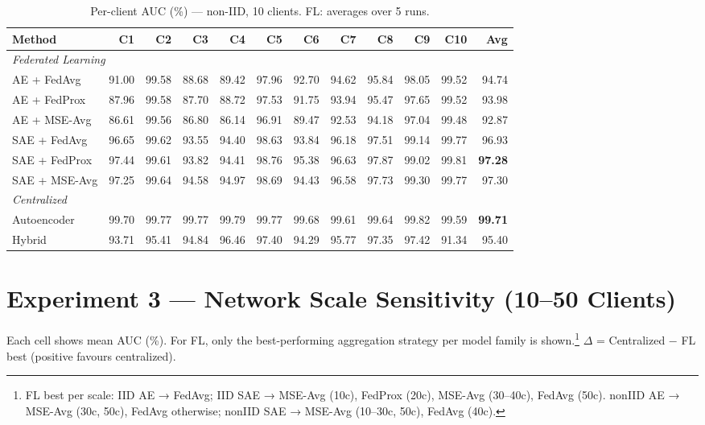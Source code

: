 \documentclass[11pt,a4paper]{article}
\begin{document}
\begin{table}[ht]
\centering
\caption{Per-client AUC (\%) — non-IID, 10 clients. FL: averages over 5 runs.}
\label{tab:per-client-noniid}
\tiny\setlength{\tabcolsep}{4pt}
\begin{tabular}{lrrrrrrrrrrr}
\toprule
\textbf{Method} & C1 & C2 & C3 & C4 & C5 & C6 & C7 & C8 & C9 & C10 & \textbf{Avg} \\
\midrule
\multicolumn{12}{l}{\textit{Federated Learning}} \\
AE + FedAvg     & 91.00 & 99.58 & 88.68 & 89.42 & 97.96 & 92.70 & 94.62 & 95.84 & 98.05 & 99.52 & 94.74 \\
AE + FedProx    & 87.96 & 99.58 & 87.70 & 88.72 & 97.53 & 91.75 & 93.94 & 95.47 & 97.65 & 99.52 & 93.98 \\
AE + MSE-Avg    & 86.61 & 99.56 & 86.80 & 86.14 & 96.91 & 89.47 & 92.53 & 94.18 & 97.04 & 99.48 & 92.87 \\
SAE + FedAvg    & 96.65 & 99.62 & 93.55 & 94.40 & 98.63 & 93.84 & 96.18 & 97.51 & 99.14 & 99.77 & 96.93 \\
SAE + FedProx   & 97.44 & 99.61 & 93.82 & 94.41 & 98.76 & 95.38 & 96.63 & 97.87 & 99.02 & 99.81 & \textbf{97.28} \\
SAE + MSE-Avg   & 97.25 & 99.64 & 94.58 & 94.97 & 98.69 & 94.43 & 96.58 & 97.73 & 99.30 & 99.77 & 97.30 \\
\midrule
\multicolumn{12}{l}{\textit{Centralized}} \\
Autoencoder     & 99.70 & 99.77 & 99.77 & 99.79 & 99.77 & 99.68 & 99.61 & 99.64 & 99.82 & 99.59 & \textbf{99.71} \\
Hybrid          & 93.71 & 95.41 & 94.84 & 96.46 & 97.40 & 94.29 & 95.77 & 97.35 & 97.42 & 91.34 & 95.40 \\
\bottomrule
\end{tabular}
\end{table}

\newpage
\section{Experiment 3 — Network Scale Sensitivity (10–50 Clients)}

Each cell shows mean AUC (\%).  For FL, only the best-performing aggregation
strategy per model family is shown.\footnote{FL best per scale:
  IID AE → FedAvg; IID SAE → MSE-Avg (10c), FedProx (20c), MSE-Avg (30–40c),
  FedAvg (50c).
  nonIID AE → MSE-Avg (30c, 50c), FedAvg otherwise; nonIID SAE → MSE-Avg (10–30c,
  50c), FedAvg (40c).}
$\Delta$ = Centralized $-$ FL best (positive favours centralized).
\end{document}
